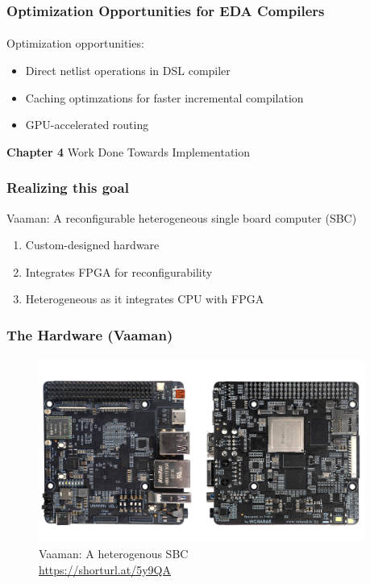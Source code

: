 \documentclass{beamer}
\begin{document}
{\begin{frame}[fragile]
  \frametitle{Optimization Opportunities for EDA Compilers}
  \framesubtitle{}
Optimization opportunities:
  \begin{itemize}
\item Direct netlist operations in DSL compiler
\item Caching optimzations for faster incremental compilation
\item GPU-accelerated routing
  \end{itemize}
\end{frame}

\begin{frame}[c,fragile]

  \centering
  \textbf{Chapter 4}
  Work Done Towards Implementation
\end{frame}

\begin{frame}[fragile]
  \frametitle{Realizing this goal}
  Vaaman: A reconfigurable heterogeneous single board computer (SBC)
  \begin{enumerate}
\item Custom-designed hardware
\item Integrates FPGA for reconfigurability
\item Heterogeneous as it integrates CPU with FPGA
  \end{enumerate}
  \framesubtitle{}
\end{frame}

\begin{frame}[fragile]
  \frametitle{The Hardware (Vaaman)}
  \framesubtitle{}
  \begin{figure}
    \centering
    \includegraphics[width=0.95\textwidth]{vaaman.jpg}
    \caption{Vaaman: A heterogenous SBC \\ \url{https://shorturl.at/5y9QA}}
    \label{neuron}
  \end{figure}
  

\end{frame}}
\end{document}
